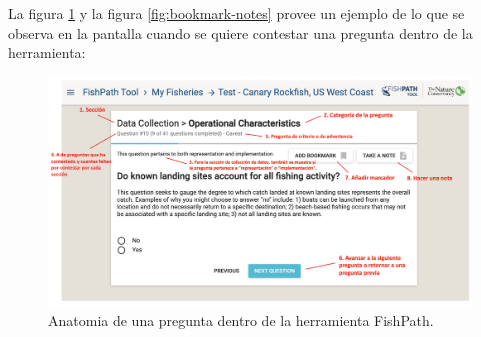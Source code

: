 \documentclass[
  11pt,
]{book}
\begin{document}
La figura \ref{fig:question-anatomy} y la figura \ref{fig:bookmark-notes} provee un ejemplo de lo que se observa en la pantalla cuando se quiere contestar una pregunta dentro de la herramienta:

\begin{figure}
 
 {\centering \includegraphics[width=0.95\linewidth]{images/question-anatomy-es} 
 
 }
 
 \caption{Anatomia de una pregunta dentro de la herramienta FishPath.}\label{fig:question-anatomy}
 \end{figure}
\end{document}
